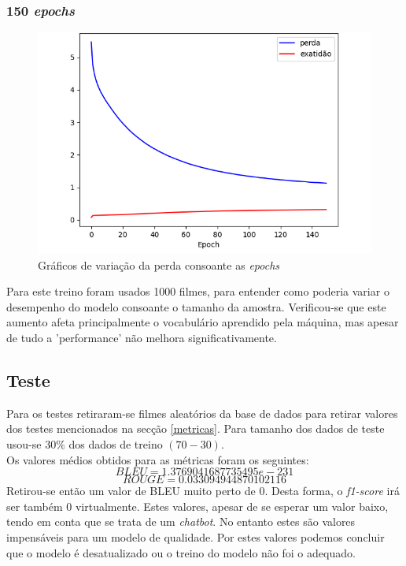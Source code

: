 \documentclass{article}
\begin{document}
\subsubsection{150 \textit{epochs}}
\begin{figure}[h]
    \centering
    \includegraphics[scale=0.4]{150epochs1000movies}
    \caption{Gráficos de variação da perda consoante as \textit{epochs}}
    \label{150epochs}
\end{figure}

Para este treino foram usados 1000 filmes, para entender como poderia variar o desempenho do modelo consoante o tamanho da amostra. Verificou-se que este aumento afeta principalmente o vocabulário aprendido pela máquina, mas apesar de tudo a 'performance' não melhora significativamente.

\subsection{Teste}

Para os testes retiraram-se filmes aleatórios da base de dados para retirar valores dos testes mencionados na secção \ref{metricas}. Para tamanho dos dados de teste usou-se $30\%$ dos dados de treino $(70-30)$.\\

Os valores médios obtidos para as métricas foram os seguintes:
$$ BLEU = 1.3769041687735495e-231$$
$$ ROUGE = 0.033094944870102116$$
Retirou-se então um valor de BLEU muito perto de 0. Desta forma, o \textit{f1-score} irá ser também 0 virtualmente. Estes valores, apesar de se esperar um valor baixo, tendo em conta que se trata de um \textit{chatbot}. No entanto estes são valores impensáveis para um modelo de qualidade. Por estes valores podemos concluir que o modelo é desatualizado ou o treino do modelo não foi o adequado.
\end{document}
